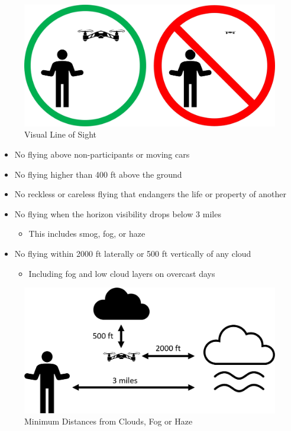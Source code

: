 \documentclass[
  12pt,
]{book}
\providecommand{\tightlist}{%
  \setlength{\itemsep}{0pt}\setlength{\parskip}{0pt}}
\begin{document}
\begin{figure}

{\centering \includegraphics[width=0.7\linewidth]{images/VLOS_simple} 

}

\caption{Visual Line of Sight}\label{fig:VLOS}
\end{figure}

\begin{itemize}
\tightlist
\item
  No flying above non-participants or moving cars
\item
  No flying higher than 400 ft above the ground
\item
  No reckless or careless flying that endangers the life or property of another
\item
  No flying when the horizon visibility drops below 3 miles

  \begin{itemize}
  \tightlist
  \item
    This includes smog, fog, or haze
  \end{itemize}
\item
  No flying within 2000 ft laterally or 500 ft vertically of any cloud

  \begin{itemize}
  \tightlist
  \item
    Including fog and low cloud layers on overcast days
  \end{itemize}
\end{itemize}

\begin{figure}

{\centering \includegraphics[width=0.7\linewidth]{images/cloud_distance} 

}

\caption{Minimum Distances from Clouds, Fog or Haze}\label{fig:cloud-distance}
\end{figure}
\end{document}
